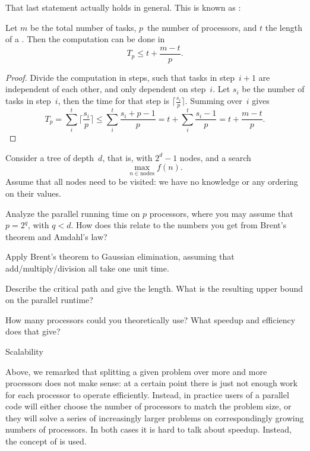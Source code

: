 That last statement actually holds in general. This is known as
:
\begin{theorem}
  Let $m$ be the total number of tasks, $p$~the number of processors,
  and $t$ the length of a . Then
  the computation can be done in \[ T_p \leq t +\frac{m-t}{p}. \]
\end{theorem}
\begin{proof}
  Divide the computation in steps, such that tasks in step~$i+1$
  are independent of each other, and only dependent on step~$i$.
  Let $s_i$ be the number of tasks in step~$i$, then the time
  for that step is $\lceil \frac{s_i}{p} \rceil$.
  Summing over~$i$ gives
  \[ T_p = \sum_i^t \lceil \frac{s_i}{p} \rceil
  \leq \sum_i^t  \frac{s_i+p-1}{p}  = t + \sum_i^t  \frac{s_i-1}{p}  = t+\frac{m-t}{p}.
  \]
\end{proof}

\begin{exercise}
  \label{ex:brent-tree}
  Consider a tree of depth~$d$, that is, with $2^d-1$ nodes,
  and a search \[ \max_{n\in\mathrm{nodes}} f(n). \]
  Assume that all nodes need to be visited: we have no knowledge
  or any ordering on their values.

  Analyze the parallel running time on $p$ processors, where
  you may assume that $p=2^q$, with $q<d$.
  How does this relate to the numbers you get from
  Brent's theorem and Amdahl's law?
\end{exercise}

\begin{exercise}
  Apply Brent's theorem to Gaussian elimination,
  assuming that add/multiply/division all take one unit time.

  Describe the critical path and give the length.
  What is the resulting upper bound on the parallel runtime?
  
  How many processors could you theoretically use?
  What speedup and efficiency does that give?
\end{exercise}

 {Scalability}
\label{sec:scaling}

Above, we remarked that splitting a given problem over more and more
processors does not make sense: at a certain point there is just not
enough work for each processor to operate efficiently.
Instead, in practice users of a parallel code will either choose the number of
processors to match the problem size, or they will solve a series of
increasingly larger problems on correspondingly growing numbers of
processors. In both cases it is hard to talk about speedup. Instead,
the concept of  is used.

